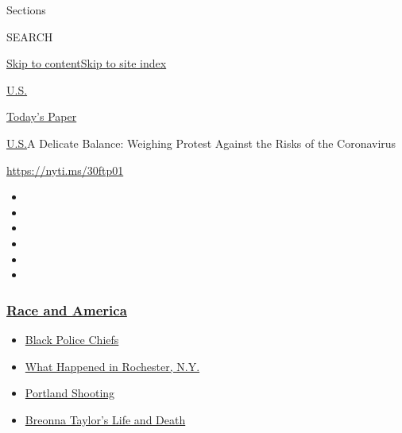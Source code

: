 Sections

SEARCH

\protect\hyperlink{site-content}{Skip to
content}\protect\hyperlink{site-index}{Skip to site index}

\href{https://www.nytimes3xbfgragh.onion/section/us}{U.S.}

\href{https://myaccount.nytimes3xbfgragh.onion/auth/login?response_type=cookie\&client_id=vi}{}

\href{https://www.nytimes3xbfgragh.onion/section/todayspaper}{Today's
Paper}

\href{/section/us}{U.S.}\textbar{}A Delicate Balance: Weighing Protest
Against the Risks of the Coronavirus

\url{https://nyti.ms/30ftp01}

\begin{itemize}
\item
\item
\item
\item
\item
\item
\end{itemize}

\hypertarget{race-and-america}{%
\subsubsection{\texorpdfstring{\href{https://www.nytimes3xbfgragh.onion/news-event/george-floyd-protests-minneapolis-new-york-los-angeles?name=styln-george-floyd\&region=TOP_BANNER\&block=storyline_menu_recirc\&action=click\&pgtype=Article\&impression_id=cbd57f50-f4c6-11ea-b359-5f738db007af\&variant=undefined}{Race
and America}}{Race and America}}\label{race-and-america}}

\begin{itemize}
\tightlist
\item
  \href{https://www.nytimes3xbfgragh.onion/2020/09/11/us/black-police-chiefs-reform.html?name=styln-george-floyd\&region=TOP_BANNER\&block=storyline_menu_recirc\&action=click\&pgtype=Article\&impression_id=cbd57f51-f4c6-11ea-b359-5f738db007af\&variant=undefined}{Black
  Police Chiefs}
\item
  \href{https://www.nytimes3xbfgragh.onion/2020/09/04/nyregion/rochester-police-daniel-prude.html?name=styln-george-floyd\&region=TOP_BANNER\&block=storyline_menu_recirc\&action=click\&pgtype=Article\&impression_id=cbd57f52-f4c6-11ea-b359-5f738db007af\&variant=undefined}{What
  Happened in Rochester, N.Y.}
\item
  \href{https://www.nytimes3xbfgragh.onion/2020/08/30/us/portland-shooting-explained.html?name=styln-george-floyd\&region=TOP_BANNER\&block=storyline_menu_recirc\&action=click\&pgtype=Article\&impression_id=cbd57f53-f4c6-11ea-b359-5f738db007af\&variant=undefined}{Portland
  Shooting}
\item
  \href{https://www.nytimes3xbfgragh.onion/2020/08/30/us/breonna-taylor-police-killing.html?name=styln-george-floyd\&region=TOP_BANNER\&block=storyline_menu_recirc\&action=click\&pgtype=Article\&impression_id=cbd57f54-f4c6-11ea-b359-5f738db007af\&variant=undefined}{Breonna
  Taylor's Life and Death}
\end{itemize}

